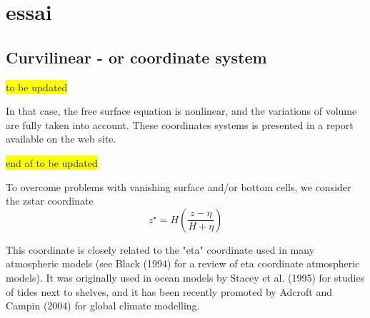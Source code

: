 \documentclass[../main/NEMO_manual]{subfiles}
\begin{document}
\chapter{ essai \zstar \sstar}
\section{Curvilinear \zstar- or \sstar coordinate system}


\colorbox{yellow}{ to be updated }

In that case, the free surface equation is nonlinear, and the variations of volume are fully taken into account.
These coordinates systems is presented in a report \citep{Levier2007} available on the \NEMO web site. 

\colorbox{yellow}{  end of to be updated}


To overcome problems with vanishing surface and/or bottom cells, we consider the zstar coordinate 
\[
  z^\star = H \left( \frac{z-\eta}{H+\eta} \right)
\]

This coordinate is closely related to the "eta" coordinate used in many atmospheric models
(see Black (1994) for a review of eta coordinate atmospheric models).
It was originally used in ocean models by Stacey et al. (1995) for studies of tides next to shelves,
and it has been recently promoted by Adcroft and Campin (2004) for global climate modelling.
\end{document}
